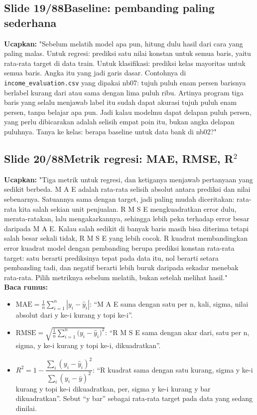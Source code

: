 \documentclass[11pt]{article}
\renewcommand{\framebox}[1]{\colorbox{acc!15}{\textcolor{acc}{\textbf{#1}}}}
\begin{document}
\subsection*{\framebox{Slide 19/88}\quad Baseline: pembanding paling sederhana}
\textbf{Ucapkan:} "Sebelum melatih model apa pun, hitung dulu hasil dari cara yang paling malas. Untuk regresi: prediksi satu nilai konstan untuk semua baris, yaitu rata-rata target di data train. Untuk klasifikasi: prediksi kelas mayoritas untuk semua baris. Angka itu yang jadi garis dasar. Contohnya di \texttt{income\_evaluation.csv} yang dipakai nb07: tujuh puluh enam persen barisnya berlabel kurang dari atau sama dengan lima puluh ribu. Artinya program tiga baris yang selalu menjawab label itu sudah dapat akurasi tujuh puluh enam persen, tanpa belajar apa pun. Jadi kalau modelmu dapat delapan puluh persen, yang perlu dibicarakan adalah selisih empat poin itu, bukan angka delapan puluhnya. Tanya ke kelas: berapa baseline untuk data bank di nb02?"\\[2pt]

\subsection*{\framebox{Slide 20/88}\quad Metrik regresi: MAE, RMSE, R\texorpdfstring{$^2$}{2}}
\textbf{Ucapkan:} "Tiga metrik untuk regresi, dan ketiganya menjawab pertanyaan yang sedikit berbeda. M A E adalah rata-rata selisih absolut antara prediksi dan nilai sebenarnya. Satuannya sama dengan target, jadi paling mudah diceritakan: rata-rata kita salah sekian unit penjualan. R M S E mengkuadratkan error dulu, merata-ratakan, lalu mengakarkannya, sehingga lebih peka terhadap error besar daripada M A E. Kalau salah sedikit di banyak baris masih bisa diterima tetapi salah besar sekali tidak, R M S E yang lebih cocok. R kuadrat membandingkan error kuadrat model dengan pembanding berupa prediksi konstan rata-rata target: satu berarti prediksinya tepat pada data itu, nol berarti setara pembanding tadi, dan negatif berarti lebih buruk daripada sekadar menebak rata-rata. Pilih metriknya sebelum melatih, bukan setelah melihat hasil."\\[2pt]
\textbf{Baca rumus:}\\[2pt]
\begin{itemize}\setlength\itemsep{0.2em}
\item $\text{MAE} = \frac{1}{n}\sum_{i=1}^{n}\left|y_i - \hat{y}_i\right|$: ``M A E sama dengan satu per n, kali, sigma, nilai absolut dari y ke-i kurang y topi ke-i''.
\item $\text{RMSE} = \sqrt{\frac{1}{n}\sum_{i=1}^{n}\bigl(y_i - \hat{y}_i\bigr)^2}$: ``R M S E sama dengan akar dari, satu per n, sigma, y ke-i kurang y topi ke-i, dikuadratkan''.
\item $R^2 = 1 - \dfrac{\sum_i (y_i-\hat{y}_i)^2}{\sum_i (y_i-\bar{y})^2}$: ``R kuadrat sama dengan satu kurang, sigma y ke-i kurang y topi ke-i dikuadratkan, per, sigma y ke-i kurang y bar dikuadratkan''. Sebut ``y bar'' sebagai rata-rata target pada data yang sedang dinilai.
\end{itemize}
\end{document}

